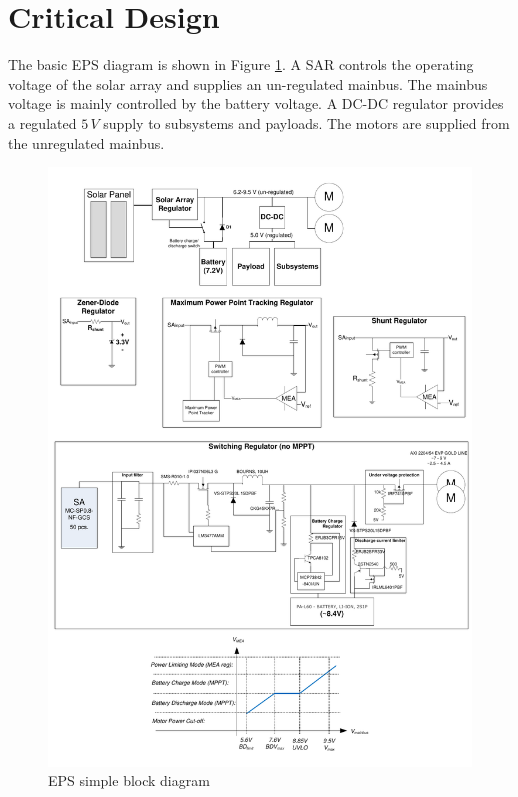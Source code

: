 \section{Critical Design}
\label{sec:critical_design}
%
The basic \ac{EPS} diagram is shown in  Figure \ref{fig:EPS_diagram_simple}. A \ac{SAR} controls the operating voltage of the solar array and supplies an un-regulated mainbus. The mainbus voltage is mainly controlled by the battery voltage. A DC-DC regulator provides a regulated $5\,V$ supply to subsystems and payloads. The motors are supplied from the unregulated mainbus.
%
\begin{figure}[H]
\centering
\includegraphics[width=\textwidth]{figures/fig_PDR_EPSdiagram}
\caption{EPS simple block diagram}
\label{fig:EPS_diagram_simple}
\end{figure}
%
%

